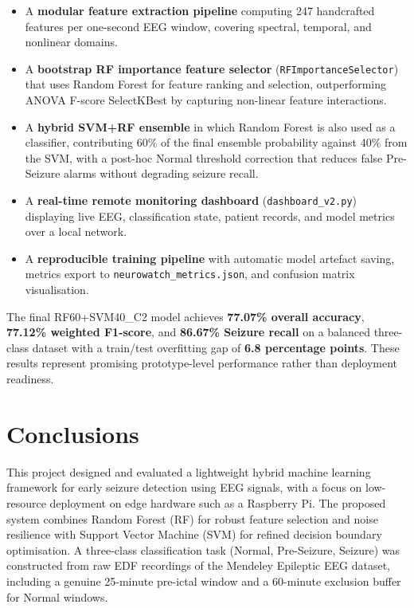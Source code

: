 \documentclass[12pt, a4paper]{report}
\begin{document}
\begin{itemize}
  \item A \textbf{modular feature extraction pipeline} computing 247
        handcrafted features per one-second EEG window, covering spectral,
        temporal, and nonlinear domains.
  \item A \textbf{bootstrap RF importance feature selector}
        (\texttt{RFImportanceSelector}) that uses Random Forest for
        feature ranking and selection, outperforming ANOVA F-score
        SelectKBest by capturing non-linear feature interactions.
  \item A \textbf{hybrid SVM+RF ensemble} in which Random Forest is also
        used as a classifier, contributing 60\% of the final ensemble
        probability against 40\% from the SVM, with a post-hoc Normal
        threshold correction that reduces
        false Pre-Seizure alarms without degrading seizure recall.
  \item A \textbf{real-time remote monitoring dashboard}
        (\texttt{dashboard\_v2.py}) displaying live EEG, classification
        state, patient records, and model metrics over a local network.
  \item A \textbf{reproducible training pipeline} with automatic model
        artefact saving, metrics export to \texttt{neurowatch\_metrics.json},
        and confusion matrix visualisation.
\end{itemize}

The final RF60+SVM40\_C2 model achieves \textbf{77.07\% overall accuracy},
\textbf{77.12\% weighted F1-score}, and \textbf{86.67\% Seizure recall}
on a balanced three-class dataset with a train/test overfitting gap of
\textbf{6.8 percentage points}. These results represent promising
prototype-level performance rather than deployment readiness.

\section{Conclusions}

This project designed and evaluated a lightweight hybrid machine learning
framework for early seizure detection using EEG signals, with a focus on
low-resource deployment on edge hardware such as a Raspberry Pi. The
proposed system combines Random Forest (RF) for robust feature selection
and noise resilience with Support Vector Machine (SVM) for refined decision
boundary optimisation. A three-class classification task (Normal,
Pre-Seizure, Seizure) was constructed from raw EDF recordings of the
Mendeley Epileptic EEG dataset, including a genuine 25-minute pre-ictal
window and a 60-minute exclusion buffer for Normal windows.
\end{document}
